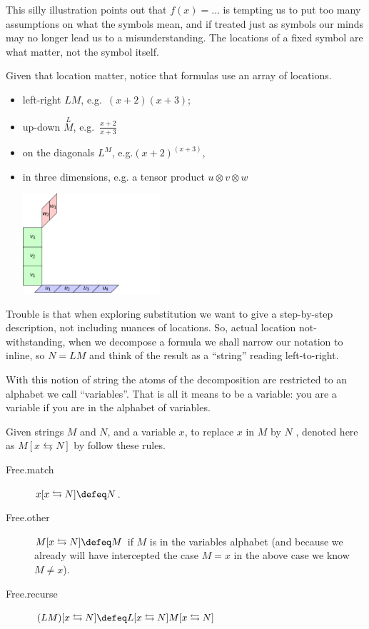This silly illustration points out that $f(x)=...$ 
is tempting us to put too many assumptions on what the symbols mean, and if treated 
just as symbols our minds may no longer lead us to a misunderstanding.  The locations
of a fixed symbol are what matter, not the symbol itself.

Given that location matter, notice that formulas use an array of locations.
\begin{itemize}
    \item left-right $LM$, e.g.\ $(x+2)(x+3)$; 
    \item up-down $\overset{L}{M}$, e.g.\ $\frac{x+2}{x+3}$\\
    \item on the diagonals $L^M$, e.g.$(x+2)^{(x+3)}$,
    \item in three dimensions, e.g. a tensor product $u\otimes v\otimes w$
    \begin{center}
        \includegraphics[width=2in,page=26]{Tensor-Product-Def-3D.pdf}
    \end{center}
\end{itemize}
Trouble is that when exploring substitution we want to give a step-by-step 
description, not including nuances of locations.  So, actual location not-withstanding,
when we decompose a formula we shall narrow 
our notation to inline, so $N=LM$ and think of the result as a ``string'' reading 
left-to-right.

With this notion of string the atoms of the decomposition are restricted to an
alphabet we call ``variables''. That is all it means to be a variable: you are a
variable if you are in the alphabet of variables.  

\begin{definition}
    Given strings $M$ and $N$, and a variable $x$, to replace $x$ in $M$ by $N$ ,
    denoted here as $M[x\leftrightarrows N]$ by follow these rules.
    \begin{description}
        \item[Free.match] $x[x\leftrightarrows N]\defeq N$.
        \item[Free.other] $M[x\leftrightarrows N]\defeq M$ if $M$ is in the variables alphabet (and 
        because we already will have intercepted the case $M=x$ in the above case we know $M\neq x$).
        
        \item[Free.recurse] $(LM)[x\leftrightarrows N]\defeq L[x\leftrightarrows N]M[x\leftrightarrows N]$
    \end{description}
\end{definition}

